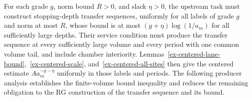 \begin{remark}\label{ex-centered-budget-open}
For each grade $g$, norm bound $R>0$, and slack $\eta>0$, the upstream task must construct stopping-depth transfer sequences, uniformly for all labels of grade $g$ and norm at most $R$, whose bound is at most $(g+\eta)\log(1/a_m)$ for all sufficiently large depths. Their service condition must produce the transfer sequence at every sufficiently large volume and every period with one common volume tail, and include chamber interiority. Lemmas~\ref{ex-centered-lane-bound},~\ref{ex-centered-scale}, and~\ref{ex-centered-all-sites} then give the centered estimate $A a_m^{-g-\eta}$ uniformly in those labels and periods. The following producer analysis establishes the finite-volume bound inequality and reduces the remaining obligation to the RG construction of the transfer sequence and its bound.
\end{remark}
